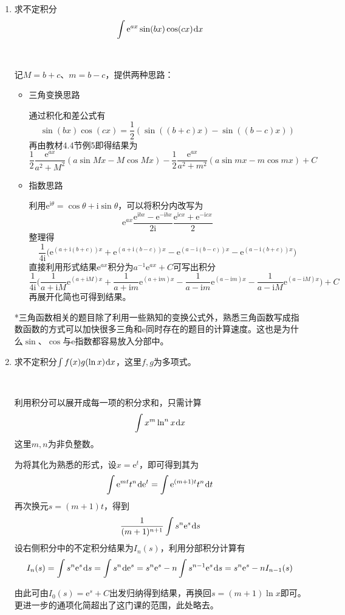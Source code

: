 \documentclass[a4paper,UTF8,fontset=windows]{ctexart}
\newcommand*{\dr}{\hspace{0.07em}\mathrm{d}}
\newcommand*{\er}{\mathrm{e}}
\newcommand*{\ir}{\mathrm{i}}
\begin{document}
\begin{enumerate}
    \item 求不定积分
    $$\int\er^{ax}\sin(bx)\cos(cx)\dr x$$

    \

    记$M=b+c$、$m=b-c$，提供两种思路：
    \begin{itemize}
        \item 三角变换思路
        
        通过积化和差公式有
        $$\sin(bx)\cos(cx)=\frac{1}{2}(\sin((b+c)x)-\sin((b-c)x))$$
        再由教材4.4节例5即得结果为
        $$\frac{1}{2}\frac{\er^{ax}}{a^2+M^2}(a\sin Mx-M\cos Mx)-\frac{1}{2}\frac{\er^{ax}}{a^2+m^2}(a\sin mx-m\cos mx)+C$$

        \item 指数思路
        
        利用$\er^{\ir\theta}=\cos\theta+\ir\sin\theta$，可以将积分内改写为
        $$\er^{ax}\frac{\er^{\ir bx}-\er^{-\ir bx}}{2\ir}\frac{\er^{\ir cx}+\er^{-\ir cx}}{2}$$
        整理得
        $$\frac{1}{4\ir}\big(\er^{(a+\ir(b+c))x}+\er^{(a+\ir(b-c))x}-\er^{(a-\ir(b-c))x}-\er^{(a-\ir(b+c))x}\big)$$
        直接利用形式结果$\er^{ax}$积分为$a^{-1}\er^{ax}+C$可写出积分
        $$\frac{1}{4\ir}\bigg(\frac{1}{a+\ir M}\er^{(a+\ir M)x}+\frac{1}{a+\ir m}\er^{(a+\ir m)x}-\frac{1}{a-\ir m}\er^{(a-\ir m)x}-\frac{1}{a-\ir M}\er^{(a-\ir M)x}\bigg)+C$$
        再展开化简也可得到结果。
    \end{itemize}

    *三角函数相关的题目除了利用一些熟知的变换公式外，熟悉三角函数写成指数函数的方式可以加快很多三角和$\er$同时存在的题目的计算速度。这也是为什么$\sin$、$\cos$与$\er$指数都容易放入分部中。

    \item 求不定积分$\int f(x)g(\ln x)\dr x$，这里$f,g$为多项式。
    
    \
    
    利用积分可以展开成每一项的积分求和，只需计算
    $$\int x^m\ln^nx\dr x$$
    这里$m,n$为非负整数。

    为将其化为熟悉的形式，设$x=\er^t$，即可得到其为
    $$\int\er^{mt}t^n\dr\er^t=\int\er^{(m+1)t}t^n\dr t$$
    再次换元$s=(m+1)t$，得到
    $$\frac{1}{(m+1)^{n+1}}\int s^n\er^s\dr s$$
    设右侧积分中的不定积分结果为$I_n(s)$，利用分部积分计算有
    $$I_n(s)=\int s^n\er^s\dr s=\int s^n\dr\er^s=s^n\er^s-n\int s^{n-1}\er^s\dr s=s^n\er^s-nI_{n-1}(s)$$

    由此可由$I_0(s)=\er^s+C$出发归纳得到结果，再换回$s=(m+1)\ln x$即可。更进一步的通项化简超出了这门课的范围，此处略去。


\end{enumerate}
\end{document}
